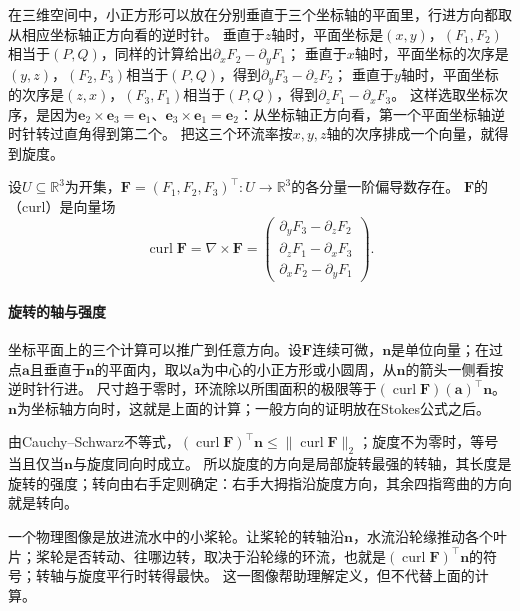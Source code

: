 在三维空间中，小正方形可以放在分别垂直于三个坐标轴的平面里，行进方向都取从相应坐标轴正方向看的逆时针。
垂直于$z$轴时，平面坐标是$(x,y)$，$(F_1,F_2)$相当于$(P,Q)$，同样的计算给出$\partial_xF_2-\partial_yF_1$；
垂直于$x$轴时，平面坐标的次序是$(y,z)$，$(F_2,F_3)$相当于$(P,Q)$，得到$\partial_yF_3-\partial_zF_2$；
垂直于$y$轴时，平面坐标的次序是$(z,x)$，$(F_3,F_1)$相当于$(P,Q)$，得到$\partial_zF_1-\partial_xF_3$。
这样选取坐标次序，是因为$\bm e_2\times\bm e_3=\bm e_1$、$\bm e_3\times\bm e_1=\bm e_2$：从坐标轴正方向看，第一个平面坐标轴逆时针转过直角得到第二个。
把这三个环流率按$x,y,z$轴的次序排成一个向量，就得到旋度。
\begin{definition}[旋度]
\label{def:multivariable-curl}
设$U\subseteq\mathbb R^3$为开集，$\bm F=(F_1,F_2,F_3)^\top:U\to\mathbb R^3$的各分量一阶偏导数存在。
$\bm F$的（curl）是向量场
\[
 \operatorname{curl}\bm F=\nabla\times\bm F
 =\begin{pmatrix}
   \partial_yF_3-\partial_zF_2\\
   \partial_zF_1-\partial_xF_3\\
   \partial_xF_2-\partial_yF_1
  \end{pmatrix}.
\]
\end{definition}

\paragraph{旋转的轴与强度}

坐标平面上的三个计算可以推广到任意方向。设$\bm F$连续可微，$\bm n$是单位向量；在过点$\bm a$且垂直于$\bm n$的平面内，取以$\bm a$为中心的小正方形或小圆周，从$\bm n$的箭头一侧看按逆时针行进。
尺寸趋于零时，环流除以所围面积的极限等于$(\operatorname{curl}\bm F)(\bm a)^\top\bm n$。$\bm n$为坐标轴方向时，这就是上面的计算；一般方向的证明放在Stokes公式之后。

由Cauchy--Schwarz不等式，$(\operatorname{curl}\bm F)^\top\bm n\leq\lVert\operatorname{curl}\bm F\rVert_2$；旋度不为零时，等号当且仅当$\bm n$与旋度同向时成立。
所以旋度的方向是局部旋转最强的转轴，其长度是旋转的强度；转向由右手定则确定：右手大拇指沿旋度方向，其余四指弯曲的方向就是转向。

一个物理图像是放进流水中的小桨轮。让桨轮的转轴沿$\bm n$，水流沿轮缘推动各个叶片；桨轮是否转动、往哪边转，取决于沿轮缘的环流，也就是$(\operatorname{curl}\bm F)^\top\bm n$的符号；转轴与旋度平行时转得最快。
这一图像帮助理解定义，但不代替上面的计算。

